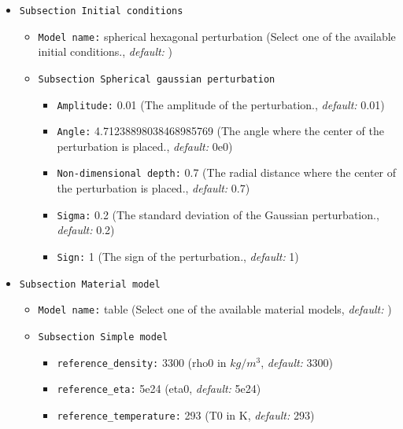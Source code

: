 \begin{itemize}
\item {\tt Subsection Initial conditions}
\begin{itemize}
\item {\tt Model name:} spherical hexagonal perturbation (Select one of the available initial conditions., {\it default:} )



\item {\tt Subsection Spherical gaussian perturbation}
\begin{itemize}
\item {\tt Amplitude:} 0.01 (The amplitude of the perturbation., {\it default:} 0.01)
\item {\tt Angle:} 4.71238898038468985769 (The angle where the center of the perturbation is placed., {\it default:} 0e0)
\item {\tt Non-dimensional depth:} 0.7 (The radial distance where the center of the perturbation is placed., {\it default:} 0.7)
\item {\tt Sigma:} 0.2 (The standard deviation of the Gaussian perturbation., {\it default:} 0.2)
\item {\tt Sign:} 1 (The sign of the perturbation., {\it default:} 1)
\end{itemize}
\end{itemize}

\item {\tt Subsection Material model}
\begin{itemize}
\item {\tt Model name:} table (Select one of the available material models, {\it default:} )



\item {\tt Subsection Simple model}
\begin{itemize}
\item {\tt reference\_density:} 3300 (rho0 in $kg / m^3$, {\it default:} 3300)
\item {\tt reference\_eta:} 5e24 (eta0, {\it default:} 5e24)
\item {\tt reference\_temperature:} 293 (T0 in K, {\it default:} 293)
\end{itemize}
\end{itemize}


\end{itemize}
